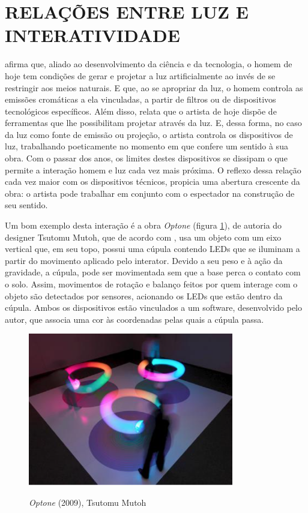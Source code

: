 \section{RELAÇÕES ENTRE LUZ E INTERATIVIDADE}

 afirma que, aliado ao desenvolvimento da ciência e da tecnologia, o homem de hoje tem condições de gerar e projetar a luz artificialmente ao invés de se restringir aos meios naturais. E que, ao se apropriar da luz, o homem controla as emissões cromáticas a ela vinculadas, a partir de filtros ou de dispositivos tecnológicos específicos. Além disso, relata que o artista de hoje dispõe de ferramentas que lhe possibilitam projetar através da luz. E, dessa forma, no caso da luz como fonte de emissão ou projeção, o artista controla os dispositivos de luz, trabalhando poeticamente no momento em que confere um sentido à sua obra. Com o passar dos anos, os limites destes dispositivos se dissipam o que permite a interação homem e luz cada vez mais próxima. O reflexo dessa relação cada vez maior com os dispositivos técnicos, propicia uma abertura crescente da obra: o artista pode trabalhar em conjunto com o espectador na construção de seu sentido.


Um bom exemplo desta interação é a obra \textit{Optone} (figura \ref{fig:tsutomu_mutoh}), de autoria do designer Tsutomu Mutoh, que de acordo com , usa um objeto com um eixo vertical que, em seu topo, possui uma cúpula contendo LEDs que se iluminam a partir do movimento aplicado pelo interator. Devido a seu peso e à ação da gravidade, a cúpula, pode ser movimentada sem que a base perca o contato com o solo. Assim, movimentos de rotação e balanço feitos por quem interage com o objeto são detectados por sensores, acionando os LEDs que estão dentro da cúpula. Ambos os dispositivos estão vinculados a um software, desenvolvido pelo autor, que associa uma cor às coordenadas pelas quais a cúpula passa.

\begin{figure}[H]
    \centering
    \caption{\textit{Optone} (2009), Tsutomu Mutoh}
	\vspace*{0,2cm}
    \includegraphics[width=0.8\textwidth]{./04-figuras/tsutomu_mutoh}
    \label{fig:tsutomu_mutoh}
\end{figure}
\vspace*{-0,9cm}
{\raggedright {}}\\

